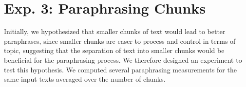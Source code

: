 \section{Exp. 3: Paraphrasing Chunks}

Initially, we hypothesized that smaller chunks of text would lead to better paraphrases, since smaller chunks are easer to process and control in terms of topic, suggesting that the separation of text into smaller chunks would be beneficial for the paraphrasing process.
We therefore designed an experiment to test this hypothesis.
We computed several paraphrasing measurements for the same input texts averaged over the number of chunks.


\begin{table}[]
\centering
\caption{Impact of the number of chunks on syntactic and semantic paraphrase measures.}
\label{tab:impact_chunks_dataset_paraphraser}
\end{table}

